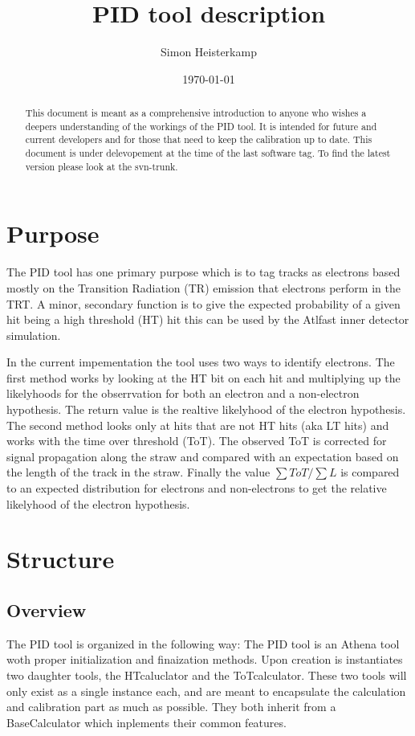 \documentclass[a4paper,11pt]{article}
\author{Simon Heisterkamp}
\title{PID tool description}
\date{\today}
\begin{document}
 

\maketitle 

\tableofcontents 

\begin{abstract}
  This document is meant as a comprehensive introduction to anyone who
  wishes a deepers understanding of the workings of the PID tool. It
  is intended for future and current developers and for those that
  need to keep the calibration up to date. This document is under
  delevopement at the time of the last software tag. To find the
  latest version please look at the svn-trunk.
\end{abstract}

\section{Purpose}
The PID tool has one primary purpose which is to tag tracks as
electrons based mostly on the Transition Radiation (TR) emission that
electrons perform in the TRT. A minor, secondary function is to give
the expected probability of a given hit being a high threshold (HT)
hit this can be used by the Atlfast inner detector simulation.

In the current impementation the tool uses two ways to identify
electrons. The first method works by looking at the HT bit on each hit
and multiplying up the likelyhoods for the obserrvation for both an
electron and a non-electron hypothesis. The return value is the
realtive likelyhood of the electron hypothesis. The second method
looks only at hits that are not HT hits (aka LT hits) and works with
the time over threshold (ToT). The observed ToT is corrected for
signal propagation along the straw and compared with an expectation
based on the length of the track in the straw. Finally the value $\sum
ToT / \sum L$ is compared to an expected distribution for electrons
and non-electrons to get the relative likelyhood of the electron
hypothesis.

\section{Structure} 

\subsection{Overview}
The PID tool is organized in the following way: The PID tool is an
Athena tool woth proper initialization and finaization methods. Upon
creation is instantiates two daughter tools, the HTcaluclator and the
ToTcalculator. These two tools will only exist as a single instance
each, and are meant to encapsulate the calculation and calibration
part as much as possible. They both inherit from a BaseCalculator
which inplements their common features.
\end{document}
